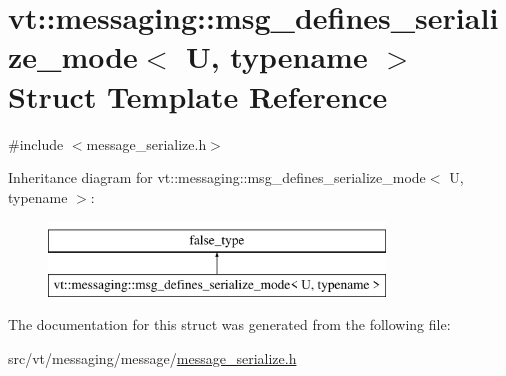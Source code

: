 \hypertarget{structvt_1_1messaging_1_1msg__defines__serialize__mode}{}\section{vt\+:\+:messaging\+:\+:msg\+\_\+defines\+\_\+serialize\+\_\+mode$<$ U, typename $>$ Struct Template Reference}
\label{structvt_1_1messaging_1_1msg__defines__serialize__mode}


{\ttfamily \#include $<$message\+\_\+serialize.\+h$>$}

Inheritance diagram for vt\+:\+:messaging\+:\+:msg\+\_\+defines\+\_\+serialize\+\_\+mode$<$ U, typename $>$\+:\begin{figure}[H]
\begin{center}
\leavevmode
\includegraphics[height=2.000000cm]{structvt_1_1messaging_1_1msg__defines__serialize__mode}
\end{center}
\end{figure}


The documentation for this struct was generated from the following file\+:\begin{DoxyCompactItemize}
\item 
src/vt/messaging/message/\hyperlink{message__serialize_8h}{message\+\_\+serialize.\+h}\end{DoxyCompactItemize}
